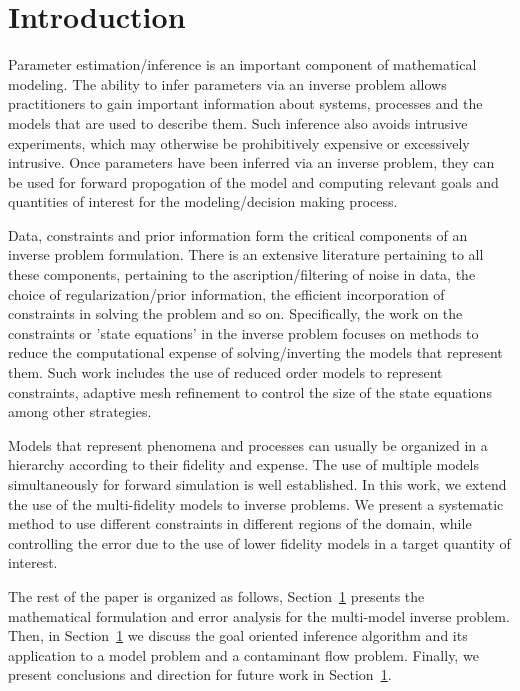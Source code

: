 \section{Introduction}

Parameter estimation/inference is an important component of mathematical modeling. The ability to infer parameters via an inverse problem allows practitioners to gain important information about systems, processes and the models that are used to describe them. Such inference also avoids intrusive experiments, which may otherwise be prohibitively expensive or excessively intrusive. Once parameters have been inferred via an inverse problem, they can be used for forward propogation of the model and computing relevant goals and quantities of interest for the modeling/decision making process.

Data, constraints and prior information form the critical components of an inverse problem formulation. There is an extensive literature pertaining to all these components, pertaining to the ascription/filtering of noise in data, the choice of regularization/prior information, the efficient incorporation of constraints in solving the problem and so on. Specifically, the work on the constraints or 'state equations' in the inverse problem focuses on methods to reduce the computational expense of solving/inverting the models that represent them. Such work includes the use of reduced order models to represent constraints, adaptive mesh refinement to control the size of the state equations among other strategies.

Models that represent phenomena and processes can usually be organized in a hierarchy according to their fidelity and expense. The use of multiple models simultaneously for forward simulation is well established. In this work, we extend the use of the multi-fidelity models to inverse problems. We present a systematic method to use different constraints in different regions of the domain, while controlling the error due to the use of lower fidelity models in a target quantity of interest.

The rest of the paper is organized as follows, Section~\ref{} presents the mathematical formulation and error analysis for the multi-model inverse problem. Then, in Section~\ref{} we discuss the goal oriented inference algorithm and its application to a model problem and a contaminant flow problem. Finally, we present conclusions and direction for future work in Section~\ref{}.

